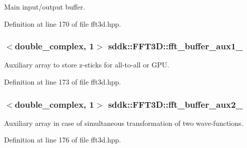 Main input/output buffer. 



Definition at line 170 of file fft3d.\+hpp.

\hypertarget{classsddk_1_1_f_f_t3_d_af73e16ad5cfd2ee76bcc013ee2f26f90}{}
\subsubsection[{fft\+\_\+buffer\+\_\+aux1\+\_\+}]{$<$double\+\_\+complex, 1$>$ sddk\+::\+F\+F\+T3\+D\+::fft\+\_\+buffer\+\_\+aux1\+\_\+\hspace{0.3cm}{\ttfamily [protected]}}\label{classsddk_1_1_f_f_t3_d_af73e16ad5cfd2ee76bcc013ee2f26f90}


Auxiliary array to store z-\/sticks for all-\/to-\/all or G\+P\+U. 



Definition at line 173 of file fft3d.\+hpp.

\hypertarget{classsddk_1_1_f_f_t3_d_a4a96ae513eb919b71eb42ca74be980cb}{}
\subsubsection[{fft\+\_\+buffer\+\_\+aux2\+\_\+}]{$<$double\+\_\+complex, 1$>$ sddk\+::\+F\+F\+T3\+D\+::fft\+\_\+buffer\+\_\+aux2\+\_\+\hspace{0.3cm}{\ttfamily [protected]}}\label{classsddk_1_1_f_f_t3_d_a4a96ae513eb919b71eb42ca74be980cb}


Auxiliary array in case of simultaneous transformation of two wave-\/functions. 



Definition at line 176 of file fft3d.\+hpp.

\hypertarget{classsddk_1_1_f_f_t3_d_a9f1235d01cc4e2e2f0f4dd2af50644bb}{}
